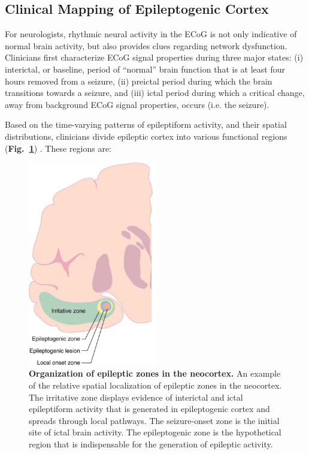 \subsection{Clinical Mapping of Epileptogenic Cortex}
For neurologists, rhythmic neural activity in the ECoG is not only indicative of normal brain activity, but also provides clues regarding network dysfunction. Clinicians first characterize ECoG signal properties during three major states: (i) interictal, or baseline, period of ``normal'' brain function that is at least four hours removed from a seizure, (ii) preictal period during which the brain transitions towards a seizure, and (iii) ictal period during which a critical change, away from background ECoG signal properties, occurs (i.e. the seizure).

Based on the time-varying patterns of epileptiform activity, and their spatial distributions, clinicians divide epileptic cortex into various functional regions (\textbf{Fig.~\ref{epileptic_zones}}) \cite{rosenow2001presurgical, nair2004critical}. These regions are:

\begin{figure}
\centering
\includegraphics[width=0.5\textwidth]{epileptic_zones}
\caption[Diagram of epileptic zones]{\textbf{Organization of epileptic zones in the neocortex.} An example of the relative spatial localization of epileptic zones in the neocortex. The irritative zone displays evidence of interictal and ictal epileptiform activity that is generated in epileptogenic cortex and spreads through local pathways. The seizure-onset zone is the initial site of ictal brain activity. The epileptogenic zone is the hypothetical region that is indispensable for the generation of epileptic activity.}
\label{epileptic_zones}
\end{figure}

